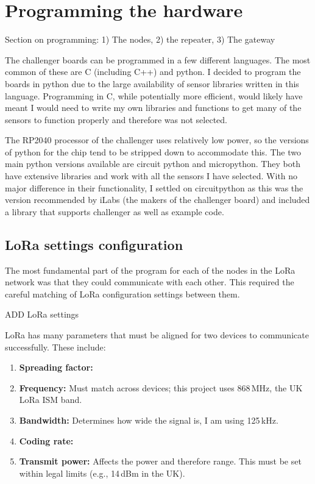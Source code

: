\section{Programming the hardware}

Section on programming: 1) The nodes, 2) the repeater, 3) The gateway

The challenger boards can be programmed in a few different languages. The most
common of these are C (including C++) and python. I decided to program the
boards in python due to the large availability of sensor libraries written in
this language. Programming in C, while potentially more efficient, would likely
have meant I would need to write my own libraries and functions to get many of
the sensors to function properly and therefore was not selected.

The RP2040 processor of the challenger uses relatively low power, so the
versions of python for the chip tend to be stripped down to accommodate this.
The two main python versions available are circuit python and micropython. They
both have extensive libraries and work with all the sensors I have selected.
With no major difference in their functionality, I settled on circuitpython as
this was the version recommended by iLabs (the makers of the challenger board)
and included a library that supports challenger as well as example code.

\subsection{LoRa settings configuration}

The most fundamental part of the program for each of the nodes in the LoRa
network was that they could communicate with each other. This required the
careful matching of LoRa configuration settings between them.

    {ADD LoRa settings}

LoRa has many parameters that must be aligned for two devices to communicate
successfully. These include:

\begin{enumerate}
  \item \textbf{Spreading factor:} 
  \item \textbf{Frequency:} Must match across devices; this project uses
  868\,MHz, the UK LoRa ISM band.
  \item \textbf{Bandwidth:} Determines how wide the signal is, I am using
  125\,kHz.
  \item \textbf{Coding rate:} 
  \item \textbf{Transmit power:} Affects the power and therefore range. This
  must be set within legal limits (e.g., 14\,dBm in the UK).
\end{enumerate}

